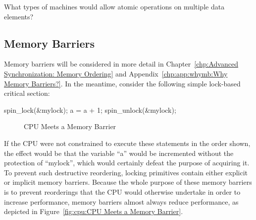 \QuickQuiz{}
	What types of machines would allow atomic operations on
	multiple data elements?
 \QuickQuizEnd

\subsection{Memory Barriers}
\label{sec:cpu:Memory Barriers}

Memory barriers will be considered in more detail in
Chapter~\ref{chp:Advanced Synchronization: Memory Ordering} and
Appendix~\ref{chp:app:whymb:Why Memory Barriers?}.
In the meantime, consider the following simple lock-based critical
section:

\begin{VerbatimN}
spin_lock(&mylock);
a = a + 1;
spin_unlock(&mylock);
\end{VerbatimN}

\begin{figure}[tb]
\centering
{}
\caption{CPU Meets a Memory Barrier}
\end{figure}

If the CPU were not constrained to execute these statements in the
order shown, the effect would be that the variable ``a'' would be
incremented without the protection of ``mylock'', which would certainly
defeat the purpose of acquiring it.
To prevent such destructive reordering, locking primitives contain
either explicit or implicit memory barriers.
Because the whole purpose of these memory barriers is to prevent reorderings
that the CPU would otherwise undertake in order to increase performance,
memory barriers almost always reduce performance, as depicted in
Figure~\ref{fig:cpu:CPU Meets a Memory Barrier}.

